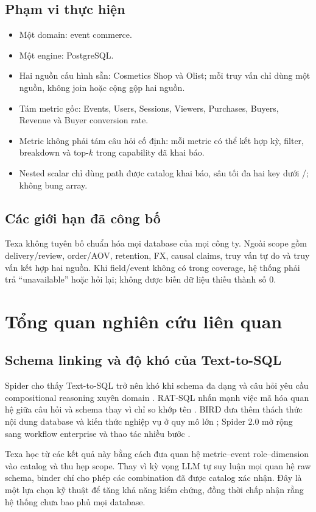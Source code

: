 \documentclass[11pt,a4paper]{article}
\begin{document}
\subsection{Phạm vi thực hiện}
\begin{itemize}
\item Một domain: event commerce.
\item Một engine: PostgreSQL.
\item Hai nguồn cấu hình sẵn: Cosmetics Shop và Olist; mỗi truy vấn chỉ dùng một nguồn, không join hoặc cộng gộp hai nguồn.
\item Tám metric gốc: Events, Users, Sessions, Viewers, Purchases, Buyers, Revenue và Buyer conversion rate.
\item Metric không phải tám câu hỏi cố định: mỗi metric có thể kết hợp kỳ, filter, breakdown và top-$k$ trong capability đã khai báo.
\item Nested scalar chỉ dùng path được catalog khai báo, sâu tối đa hai key dưới /; không bung array.
\end{itemize}
\subsection{Các giới hạn đã công bố}
Texa không tuyên bố chuẩn hóa mọi database của mọi công ty. Ngoài scope gồm delivery/review, order/AOV, retention, FX, causal claims, truy vấn tự do và truy vấn kết hợp hai nguồn. Khi field/event không có trong coverage, hệ thống phải trả ``unavailable'' hoặc hỏi lại; không được biến dữ liệu thiếu thành số 0.

\section{Tổng quan nghiên cứu liên quan}
\subsection{Schema linking và độ khó của Text-to-SQL}
Spider cho thấy Text-to-SQL trở nên khó khi schema đa dạng và câu hỏi yêu cầu compositional reasoning xuyên domain \cite{yu2018spider}. RAT-SQL nhấn mạnh việc mã hóa quan hệ giữa câu hỏi và schema thay vì chỉ so khớp tên \cite{wang2020ratsql}. BIRD đưa thêm thách thức nội dung database và kiến thức nghiệp vụ ở quy mô lớn \cite{li2023bird}; Spider 2.0 mở rộng sang workflow enterprise và thao tác nhiều bước \cite{lei2024spider2}.

Texa học từ các kết quả này bằng cách đưa quan hệ metric--event role--dimension vào catalog và thu hẹp scope. Thay vì kỳ vọng LLM tự suy luận mọi quan hệ raw schema, binder chỉ cho phép các combination đã được catalog xác nhận. Đây là một lựa chọn kỹ thuật để tăng khả năng kiểm chứng, đồng thời chấp nhận rằng hệ thống chưa bao phủ mọi database.
\end{document}
